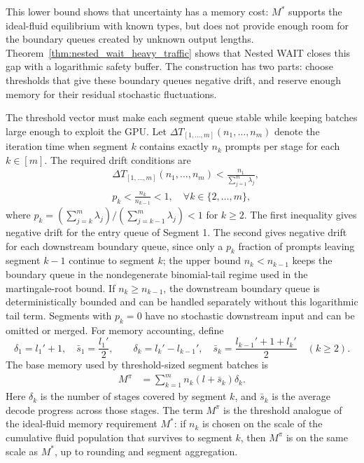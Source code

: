 This lower bound shows that uncertainty has a memory cost: \(M^*\) supports the ideal-fluid equilibrium with known types, but does not provide enough room for the boundary queues created by unknown output lengths. Theorem~\ref{thm:nested_wait_heavy_traffic} shows that Nested WAIT closes this gap with a logarithmic safety buffer. The construction has two parts: choose thresholds that give these boundary queues negative drift, and reserve enough memory for their residual stochastic fluctuations.

The threshold vector must make each segment queue stable while keeping batches large enough to exploit the GPU. Let \(\Delta T_{[1,\dots,m]}(n_1,\dots,n_m)\) denote the iteration time when segment \(k\) contains exactly \(n_k\) prompts per stage for each \(k\in[m]\). The required drift conditions are
\begin{equation}
    \label{eq:nested_wait_thresholds}
    \begin{aligned}
    &\Delta T_{[1,\dots,m]}(n_1, \dots, n_m) <\frac{n_1}{\sum_{j=1}^m \lambda_j}, \\
    &p_k < \frac{n_k}{n_{k-1}} < 1,\quad \forall k \in \{2, \dots, m\},
    \end{aligned}
\end{equation}
where \(p_k = (\sum_{j=k}^m\lambda_j)/(\sum_{j=k-1}^m\lambda_j)<1\) for \(k\ge2\). The first inequality gives negative drift for the entry queue of Segment 1. The second gives negative drift for each downstream boundary queue, since only a \(p_k\) fraction of prompts leaving segment \(k-1\) continue to segment \(k\); the upper bound \(n_k<n_{k-1}\) keeps the boundary queue in the nondegenerate binomial-tail regime used in the martingale-root bound. If \(n_k\ge n_{k-1}\), the downstream boundary queue is deterministically bounded and can be handled separately without this logarithmic tail term. Segments with \(p_k=0\) have no stochastic downstream input and can be omitted or merged. For memory accounting, define
\[
\delta_1=l_1'+1,\quad \bar s_1=\frac{l_1'}{2},\qquad
\delta_k=l_k'-l_{k-1}',\quad \bar s_k=\frac{l_{k-1}'+1+l_k'}{2}\quad (k\ge2).
\]
The base memory used by threshold-sized segment batches is
\begin{equation}
    \label{eq:nested_wait_memory}
\begin{aligned}
        M^\pi &= \sum_{k=1}^m n_k (l+\bar s_k)\delta_k .
\end{aligned}
\end{equation}
Here \(\delta_k\) is the number of stages covered by segment \(k\), and \(\bar s_k\) is the average decode progress across those stages. The term \(M^\pi\) is the threshold analogue of the ideal-fluid memory requirement \(M^*\): if \(n_k\) is chosen on the scale of the cumulative fluid population that survives to segment \(k\), then \(M^\pi\) is on the same scale as \(M^*\), up to rounding and segment aggregation.

